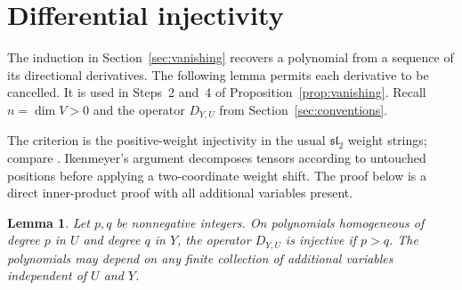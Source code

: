 \documentclass[11pt]{article}
\newtheorem{lemma}[theorem]{Lemma}
\theoremstyle{remark}
\newcommand{\D}[2]{D_{#1,#2}}
\begin{document}
\section{Differential injectivity}\label{sec:differential}

The induction in Section~\ref{sec:vanishing} recovers a polynomial from a
sequence of its directional derivatives. The following lemma permits each
derivative to be cancelled. It is used in Steps~2 and~4 of
Proposition~\ref{prop:vanishing}. Recall $n=\dim V>0$ and the operator
$\D YU$ from Section~\ref{sec:conventions}.

The criterion is the positive-weight injectivity in the usual
$\mathfrak{sl}_2$ weight strings; compare
\cite[Section~11.1, Claim~11.4 and equation~(11.5)]{FultonHarris}.
Ikenmeyer's argument \cite[Section~5, Claim~5.1]{Ikenmeyer} decomposes
tensors according to untouched positions before applying a two-coordinate
weight shift. The proof below is a direct inner-product proof with all
additional variables present.

\begin{lemma}\label{lem:shift}
Let $p,q$ be nonnegative integers. On polynomials homogeneous of degree $p$
in $U$ and degree $q$ in $Y$, the operator $\D{Y}{U}$ is injective if
$p>q$. The polynomials may depend on any finite collection of additional
variables independent of $U$ and $Y$.
\end{lemma}
\end{document}
